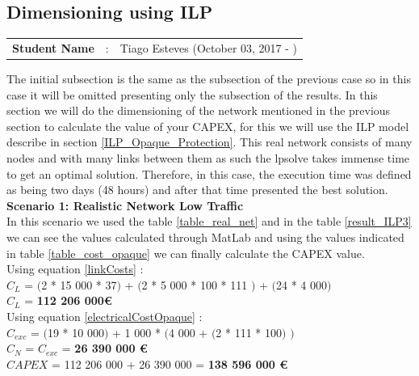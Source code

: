\subsection{Dimensioning using ILP}
\begin{tcolorbox}	
\begin{tabular}{p{2.75cm} p{0.2cm} p{10.5cm}} 	
\textbf{Student Name}  &:& Tiago Esteves    (October 03, 2017 - )\\
\end{tabular}
\end{tcolorbox}

The initial subsection is the same as the subsection of the previous case so in this case it will be omitted presenting only the subsection of the results.
In this section we will do the dimensioning of the network mentioned in the previous section to calculate the value of your CAPEX, for this we will use the ILP model describe in section \ref{ILP_Opaque_Protection}.
This real network consists of many nodes and with many links between them as such the lpsolve takes immense time to get an optimal solution. Therefore, in this case, the execution time was defined as being two days (48 hours) and after that time presented the best solution.\\

\textbf{Scenario 1: Realistic Network Low Traffic} \label{Scenario3_opaque_p} \\

In this scenario we used the table \ref{table_real_net} and in the table \ref{result_ILP3} we can see the values calculated through MatLab and using the values indicated in table \ref{table_cost_opaque} we can finally calculate the CAPEX value.\\

Using equation \ref{linkCosts} : \\
$C_L$ = $($2 * 15 000 * 37$)$ + $($2 * 5 000 * 100 * 111 $)$ + $($24 * 4 000$)$ \\
$C_L$ = \textbf{112 206 000\euro} \\

Using equation \ref{electricalCostOpaque} : \\
$C_{exc}$ = $($19 * 10 000$)$ + 1 000 * $($4 000 + $($2 * 111 * 100$)$ $)$ \\
$C_N$ = $C_{exc}$ = \textbf{26 390 000 \euro} \\

$CAPEX$ = 112 206 000 + 26 390 000 = \textbf{138 596 000 \euro}\\

